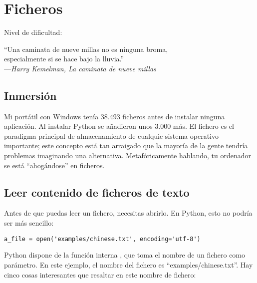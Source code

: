 
\chapter{Ficheros}\label{ch:ficheros}

\noindent
Nivel de dificultad:\diflll

\begin{citaCap}
``Una caminata de nueve millas no es ninguna broma, \\
especialmente si se hace bajo la lluvia.'' \\
---\emph{Harry Kemelman, La caminata de nueve millas}
\end{citaCap}

\section{Inmersión}

Mi portátil con Windows tenía 38.493 ficheros antes de instalar ninguna aplicación. Al instalar Python se añadieron unos 3.000 más. El fichero es el paradigma principal de almacenamiento de cualquie sistema operativo importante; este concepto está tan arraigado que la mayoría de la gente tendría problemas imaginando una alternativa. Metafóricamente hablando, tu ordenador se está ``ahogándose'' en ficheros.

\section{Leer contenido de ficheros de texto}

Antes de que puedas leer un fichero, necesitas abrirlo. En Python, esto no podría ser más sencillo:

\noindent\begin{minipage}{\textwidth}
\begin{lstlisting}[mathescape=True]
a_file = open('examples/chinese.txt', encoding='utf-8')
\end{lstlisting}
\end{minipage}

Python dispone de la función interna , que toma el nombre de un fichero como parámetro. En este ejemplo, el nombre del fichero es ``examples/chinese.txt''. Hay cinco cosas interesantes que resaltar en este nombre de fichero:

